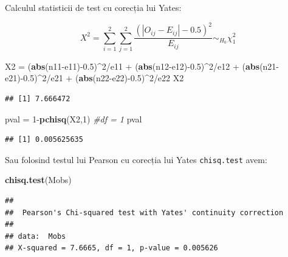 \documentclass[]{article}
\newenvironment{Shaded}{\begin{snugshade}}{\end{snugshade}}
\newcommand{\KeywordTok}[1]{\textcolor[rgb]{0.13,0.29,0.53}{\textbf{{#1}}}}
\newcommand{\DecValTok}[1]{\textcolor[rgb]{0.00,0.00,0.81}{{#1}}}
\newcommand{\FloatTok}[1]{\textcolor[rgb]{0.00,0.00,0.81}{{#1}}}
\newcommand{\StringTok}[1]{\textcolor[rgb]{0.31,0.60,0.02}{{#1}}}
\newcommand{\CommentTok}[1]{\textcolor[rgb]{0.56,0.35,0.01}{\textit{{#1}}}}
\newcommand{\NormalTok}[1]{{#1}}
\begin{document}
Calculul statisticii de test cu corecția lui Yates:

\[
  X^2 = \sum_{i=1}^{2}\sum_{j=1}^{2}\frac{\left(|O_{ij}-E_{ij}|-0.5\right)^2}{E_{ij}}\sim_{H_0}\chi_1^2
\]

\begin{Shaded}
\begin{Highlighting}[]
\NormalTok{X2 =}\StringTok{ }\NormalTok{(}\KeywordTok{abs}\NormalTok{(n11-e11)-}\FloatTok{0.5}\NormalTok{)^}\DecValTok{2}\NormalTok{/e11 +}\StringTok{ }\NormalTok{(}\KeywordTok{abs}\NormalTok{(n12-e12)-}\FloatTok{0.5}\NormalTok{)^}\DecValTok{2}\NormalTok{/e12 +}\StringTok{ }
\StringTok{  }\NormalTok{(}\KeywordTok{abs}\NormalTok{(n21-e21)-}\FloatTok{0.5}\NormalTok{)^}\DecValTok{2}\NormalTok{/e21 +}\StringTok{ }\NormalTok{(}\KeywordTok{abs}\NormalTok{(n22-e22)-}\FloatTok{0.5}\NormalTok{)^}\DecValTok{2}\NormalTok{/e22}
\NormalTok{X2}
\end{Highlighting}
\end{Shaded}

\begin{verbatim}
## [1] 7.666472
\end{verbatim}

\begin{Shaded}
\begin{Highlighting}[]
\NormalTok{pval =}\StringTok{ }\DecValTok{1}\NormalTok{-}\KeywordTok{pchisq}\NormalTok{(X2,}\DecValTok{1}\NormalTok{) }\CommentTok{#df = 1}
\NormalTok{pval}
\end{Highlighting}
\end{Shaded}

\begin{verbatim}
## [1] 0.005625635
\end{verbatim}

Sau folosind testul lui Pearson cu corecția lui Yates
\texttt{chisq.test} avem:

\begin{Shaded}
\begin{Highlighting}[]
\KeywordTok{chisq.test}\NormalTok{(Mobs)}
\end{Highlighting}
\end{Shaded}

\begin{verbatim}
## 
##  Pearson's Chi-squared test with Yates' continuity correction
## 
## data:  Mobs
## X-squared = 7.6665, df = 1, p-value = 0.005626
\end{verbatim}
\end{document}
